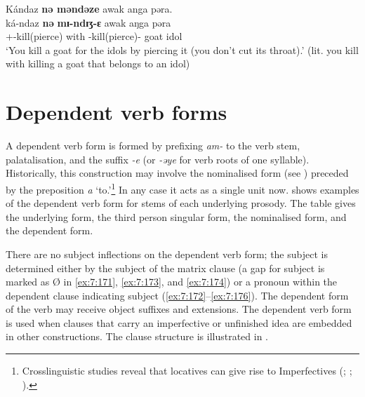 \ea \label{ex:7:170}
Kándaz \textbf{nə  məndəze} awak  anga  pəra.\\
\gll ká-ndaz \textbf{nə}  \textbf{mɪ-ndɪʒ-ɛ} awak aŋga pəra\\
{\twoS}+{\IFV}-kill(pierce)  with  {\NOM}{}-kill(pierce)-{\CL}  goat  {\POSS}  idol\\
\glt ‘You kill a goat for the idols by piercing it (you don’t cut its throat).’ (lit. you kill with killing a goat that belongs to an idol)
\z
{}
\section{Dependent verb forms}\label{sec:7.7}
\hypertarget{RefHeading1212481525720847}{}
A dependent verb form is formed by prefixing \textit{am-} to the verb stem, palatalisation, and the suffix \textit{{}-e} (or \textit{{}-əye} for verb roots of one syllable). Historically, this construction may involve the nominalised form (see ) preceded by the preposition \textit{a} ‘to.’\footnote{Crosslinguistic studies reveal that locatives can give rise to Imperfectives (\citealt[103]{Comrie1976}; \citealt[142]{BybeeEtAl1994}; \citealt[99]{HeineKuteva2002}).} In any case it acts as a single unit now.  shows examples of the dependent verb form for stems of each underlying prosody. The table gives the underlying form, the third person singular form, the nominalised form, and the dependent form. 

\begin{table}
\caption{Dependent verb forms\label{tab:69}}
\end{table}

There are no subject inflections on the dependent verb form; the subject is determined either by the subject of the matrix clause (a gap for subject is marked as Ø in \ref{ex:7:171}, \ref{ex:7:173}, and \ref{ex:7:174}) or a pronoun within the dependent clause indicating subject (\ref{ex:7:172}--\ref{ex:7:176}). The dependent form of the verb may receive object suffixes and extensions.  The dependent verb form is used when clauses that carry an imperfective or unfinished idea are embedded in other constructions. The clause structure is illustrated in .
\clearpage

